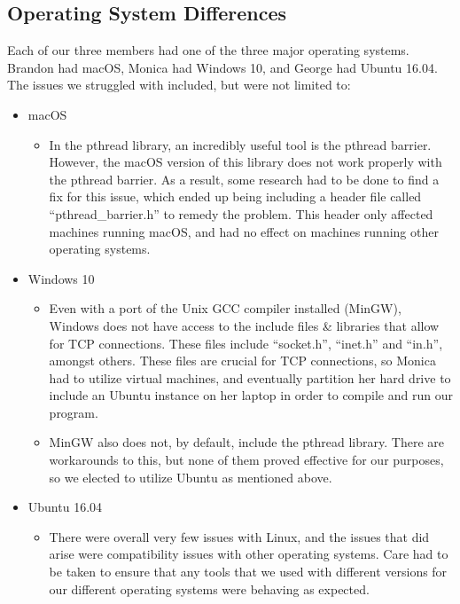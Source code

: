 \documentclass{article}
\begin{document}
\subsection{Operating System Differences}
Each of our three members had one of the three major operating systems. Brandon had macOS, Monica had Windows 10, and George had Ubuntu 16.04. The issues we struggled with included, but were not limited to:
\begin{itemize}
\item{macOS
	\begin{itemize}
    \item{In the pthread library, an incredibly useful tool is the pthread barrier. However, the macOS version of this library does not work properly with the pthread barrier. As a result, some research had to be done to find a fix for this issue, which ended up being including a header file called ``pthread\_barrier.h'' to remedy the problem. This header only affected machines running macOS, and had no effect on machines running other operating systems.}
    \end{itemize}
}
\item{Windows 10
	\begin{itemize}
    \item{Even with a port of the Unix GCC compiler installed (MinGW), Windows does not have access to the include files \& libraries that allow for TCP connections. These files include ``socket.h'', ``inet.h'' and ``in.h'', amongst others. These files are crucial for TCP connections, so Monica had to utilize virtual machines, and eventually partition her hard drive to include an Ubuntu instance on her laptop in order to compile and run our program.}
    \item{MinGW also does not, by default, include the pthread library. There are workarounds to this, but none of them proved effective for our purposes, so we elected to utilize Ubuntu as mentioned above.}
    \end{itemize}
}
\item{Ubuntu 16.04
	\begin{itemize}
    \item{There were overall very few issues with Linux, and the issues that did arise were compatibility issues with other operating systems. Care had to be taken to ensure that any tools that we used with different versions for our different operating systems were behaving as expected.}
    \end{itemize}
}
\end{itemize}
\end{document}
